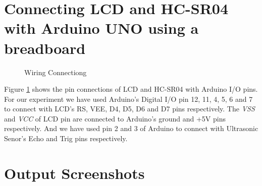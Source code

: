\documentclass{article}
\begin{document}
\section{Connecting LCD and HC-SR04 with Arduino UNO using a breadboard}
\begin{figure}[H]
    \centering
    \caption{Wiring Connectiong}
    \label{fig:wiring}
\end{figure}
Figure \ref{fig:wiring} shows the pin connections of LCD and HC-SR04 with Arduino I/O pins. For our experiment we have used Arduino's Digital I/O pin 12, 11, 4, 5, 6 and 7 to connect with LCD's RS, VEE, D4, D5, D6 and D7 pins respectively. The \emph{VSS} and \emph{VCC} of LCD pin are connected to Arduino's ground and +5V pins respectively. And we have used pin 2 and 3 of Arduino to connect with Ultrasonic Senor's Echo and Trig pins respectively.

\section{Output Screenshots}
\end{document}
